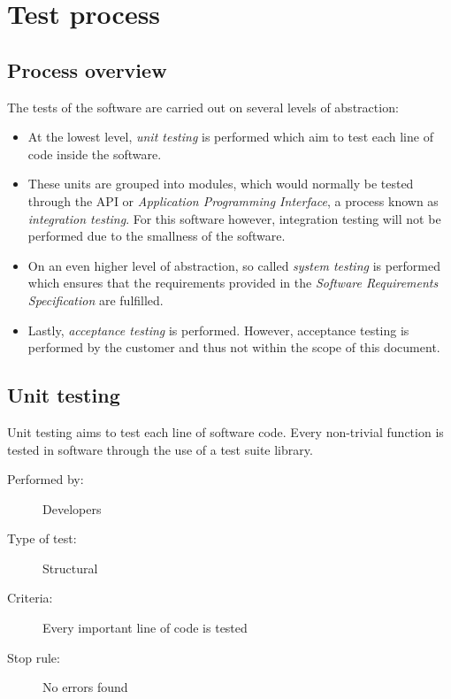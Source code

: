 \documentclass[12pt,titlepage]{article}
\begin{document}

\section{Test process}
\label{sec:test-process}

\subsection{Process overview}
\label{subsec:test-process-process-overview}

The tests of the software are carried out on several levels of abstraction:

\begin{itemize}
\item
At the lowest level, \textit{unit testing} is performed which aim to test each
line of code inside the software.
\item
These units are grouped into modules, which would
normally be tested through the API or \textit{Application Programming
Interface}, a process known as \textit{integration testing}. For this software
however, integration testing will not be performed due to the smallness of the
software.
\item
On an even higher level of abstraction, so called \textit{system testing} is
performed which ensures that the requirements provided in the \textit{Software
Requirements Specification} are fulfilled.
\item
Lastly, \textit{acceptance testing} is performed. However, acceptance
testing is performed by the customer and thus not within the scope of this
document.
\end{itemize}

\subsection{Unit testing}
\label{subsec:test-process-unit-testing}

Unit testing aims to test each line of software code. Every non-trivial function
is tested in software through the use of a test suite library.

\begin{description}
	\item[Performed by:]	Developers
	\item[Type of test:]	Structural
	\item[Criteria:]	Every important line of code is tested
	\item[Stop rule:]	No errors found
\end{description}
\end{document}
